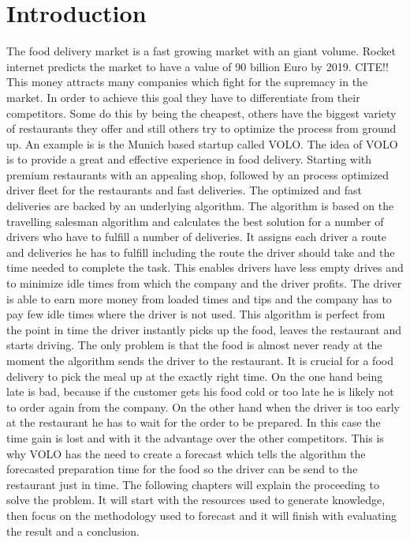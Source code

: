 \chapter{Introduction}\label{chapter:Introduction}

\renewcommand{\thepage}{\arabic{page}}
\setcounter{page}{1}

The food delivery market is a fast growing market with an giant volume. Rocket internet predicts the market to have a value of 90 billion Euro by 2019. CITE!! This money attracts many companies which fight for the supremacy in the market. In order to achieve this goal they have to differentiate from their competitors. Some do this by being the cheapest, others have the biggest variety of restaurants they offer and still others try to optimize the process from ground up.\newline
An example is is the Munich based startup called VOLO. The idea of VOLO is to provide a great and effective experience in food delivery. Starting with premium restaurants with an appealing shop, followed by an process optimized driver fleet for the restaurants and fast deliveries. The optimized and fast deliveries are backed by an underlying algorithm. The algorithm is based on the travelling salesman algorithm and calculates the best solution for a number of drivers who have to fulfill a number of deliveries. It assigns each driver a route and deliveries he has to fulfill including the route the driver should take and the time needed to complete the task. This enables drivers have less empty drives and to minimize idle times from which the company and the driver profits. The driver is able to earn more money from loaded times and tips and the company has to pay few idle times where the driver is not used.\newline
This algorithm is perfect from the point in time the driver instantly picks up the food, leaves the restaurant and starts driving. The only problem is that the food is almost never ready at the moment the algorithm sends the driver to the restaurant. It is crucial for a food delivery to pick the meal up at the exactly right time. On the one hand being late is bad, because if the customer gets his food cold or too late he is likely not to order again from the company. On the other hand when the driver is too early at the restaurant he has to wait for the order to be prepared. In this case the time gain is lost and with it the advantage over the other competitors.
This is why VOLO has the need to create a forecast which tells the algorithm the forecasted preparation time for the food so the driver can be send to the restaurant just in time.\newline
The following chapters will explain the proceeding to solve the problem. It will start with the resources used to generate knowledge, then focus on the methodology used to forecast and it will finish with evaluating the result and a conclusion.
